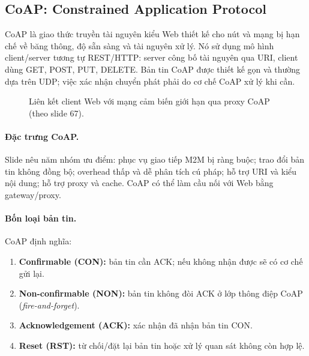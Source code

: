 \subsection{CoAP: Constrained Application Protocol}
CoAP là giao thức truyền tài nguyên kiểu Web thiết kế cho nút và mạng bị hạn chế về băng thông, độ sẵn sàng và tài nguyên xử lý. Nó sử dụng mô hình client/server tương tự REST/HTTP: server công bố tài nguyên qua URI, client dùng GET, POST, PUT, DELETE. Bản tin CoAP được thiết kế gọn và thường dựa trên UDP; việc xác nhận chuyển phát phải do cơ chế CoAP xử lý khi cần. 

\begin{figure}[htbp]\centering
{}
\caption{Liên kết client Web với mạng cảm biến giới hạn qua proxy CoAP (theo slide 67).}\end{figure}

\paragraph{Đặc trưng CoAP.} Slide nêu năm nhóm ưu điểm: phục vụ giao tiếp M2M bị ràng buộc; trao đổi bản tin không đồng bộ; overhead thấp và dễ phân tích cú pháp; hỗ trợ URI và kiểu nội dung; hỗ trợ proxy và cache. CoAP có thể làm cầu nối với Web bằng gateway/proxy. 

\paragraph{Bốn loại bản tin.} CoAP định nghĩa:
\begin{enumerate}[leftmargin=2em]
\item \textbf{Confirmable (CON):} bản tin cần ACK; nếu không nhận được sẽ có cơ chế gửi lại.
\item \textbf{Non-confirmable (NON):} bản tin không đòi ACK ở lớp thông điệp CoAP (\emph{fire-and-forget}).
\item \textbf{Acknowledgement (ACK):} xác nhận đã nhận bản tin CON.
\item \textbf{Reset (RST):} từ chối/đặt lại bản tin hoặc xử lý quan sát không còn hợp lệ.
\end{enumerate}

